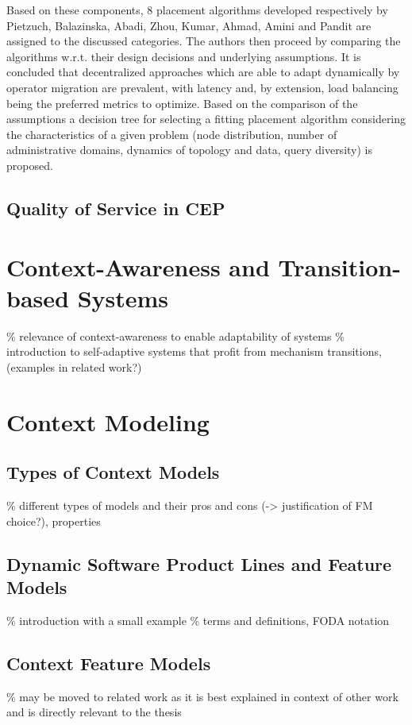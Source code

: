 Based on these components, 8 placement algorithms developed respectively by Pietzuch, Balazinska, Abadi, Zhou, Kumar, Ahmad, Amini and Pandit are assigned to the discussed categories. The authors then proceed by comparing the algorithms w.r.t. their design decisions and underlying assumptions. It is concluded that decentralized approaches which are able to adapt dynamically by operator migration are prevalent, with latency and, by extension, load balancing being the preferred metrics to optimize. 
Based on the comparison of the assumptions a decision tree for selecting a fitting placement algorithm considering the characteristics of a given problem (node distribution, number of administrative domains, dynamics of topology and data, query diversity) is proposed.


\subsection{Quality of Service in CEP}

\section{Context-Awareness and Transition-based Systems}
\% relevance of context-awareness to enable adaptability of systems
\% introduction to self-adaptive systems that profit from mechanism transitions, (examples in related work?)

\section{Context Modeling}

%
\subsection{Types of Context Models}
\% different types of models and their pros and cons (-> justification of FM choice?), properties
\subsection{Dynamic Software Product Lines and Feature Models}
\% introduction with a small example
\% terms and definitions, FODA notation
\subsection{Context Feature Models} 
\% may be moved to related work as it is best explained in context of other work and is directly relevant to the thesis
